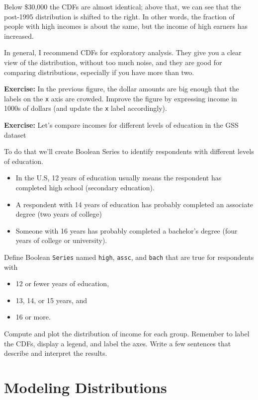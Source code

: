 Below \$30,000 the CDFs are almost identical; above that, we can see
that the post-1995 distribution is shifted to the right. In other words,
the fraction of people with high incomes is about the same, but the
income of high earners has increased.

In general, I recommend CDFs for exploratory analysis. They give you a
clear view of the distribution, without too much noise, and they are
good for comparing distributions, especially if you have more than two.

\textbf{Exercise:} In the previous figure, the dollar amounts are big
enough that the labels on the \passthrough{\lstinline!x!} axis are
crowded. Improve the figure by expressing income in 1000s of dollars
(and update the \passthrough{\lstinline!x!} label accordingly).

\textbf{Exercise:} Let's compare incomes for different levels of
education in the GSS dataset

To do that we'll create Boolean Series to identify respondents with
different levels of education.

\begin{itemize}
\item
  In the U.S, 12 years of education usually means the respondent has
  completed high school (secondary education).
\item
  A respondent with 14 years of education has probably completed an
  associate degree (two years of college)
\item
  Someone with 16 years has probably completed a bachelor's degree (four
  years of college or university).
\end{itemize}

Define Boolean \passthrough{\lstinline!Series!} named
\passthrough{\lstinline!high!}, \passthrough{\lstinline!assc!}, and
\passthrough{\lstinline!bach!} that are true for respondents with

\begin{itemize}
\item
  12 or fewer years of education,
\item
  13, 14, or 15 years, and
\item
  16 or more.
\end{itemize}

Compute and plot the distribution of income for each group. Remember to
label the CDFs, display a legend, and label the axes. Write a few
sentences that describe and interpret the results.

\hypertarget{modeling-distributions}{%
\section{Modeling Distributions}\label{modeling-distributions}}

